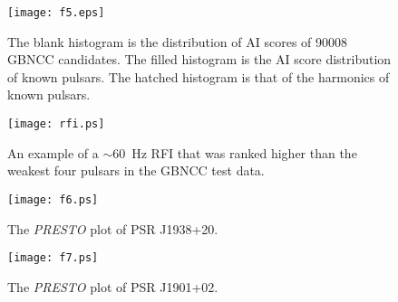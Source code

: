 \documentclass[12pt,preprint]{aastex}
\begin{document}
\begin{figure}
\texttt{[image: f5.eps]} \\ 
\caption {\label{fig:GBNCC} 
The blank histogram is the distribution of AI scores of 90008 GBNCC
candidates. The filled histogram is the AI score distribution of known pulsars. 
The hatched histogram is that of the harmonics of known pulsars.
}
\end{figure} 

\begin{figure}
\texttt{[image: rfi.ps]} \\ 
\caption {\label{fig:rfi} 
An example of a $\sim$60~Hz RFI that was ranked higher than the weakest four  
pulsars in the GBNCC test data.
}
\end{figure} 


\begin{figure}
\texttt{[image: f6.ps]} \\ 
\caption {\label{fig:1938} 
The {\it PRESTO} plot of PSR J1938+20.
}
\end{figure} 

\begin{figure}
\texttt{[image: f7.ps]} \\ 
\caption {\label{fig:1901} 
The {\it PRESTO} plot of PSR J1901+02.
}
\end{figure} 
\end{document}
